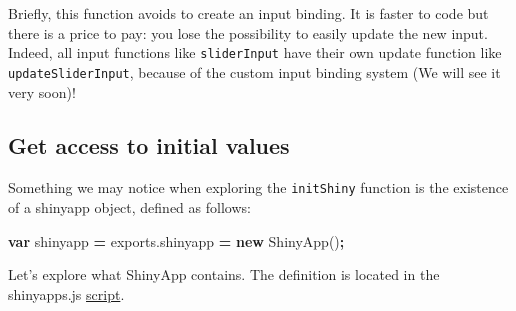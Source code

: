 \documentclass[]{book}
\newenvironment{Shaded}{\begin{snugshade}}{\end{snugshade}}
\newcommand{\AttributeTok}[1]{\textcolor[rgb]{0.77,0.63,0.00}{#1}}
\newcommand{\KeywordTok}[1]{\textcolor[rgb]{0.13,0.29,0.53}{\textbf{#1}}}
\newcommand{\NormalTok}[1]{#1}
\newcommand{\OperatorTok}[1]{\textcolor[rgb]{0.81,0.36,0.00}{\textbf{#1}}}
\newcommand{\VariableTok}[1]{\textcolor[rgb]{0.00,0.00,0.00}{#1}}
\begin{document}
Briefly, this function avoids to create an input binding. It is faster to code but there is a price to pay: you lose the possibility to easily update the new input. Indeed, all input functions like \texttt{sliderInput} have their own update function like \texttt{updateSliderInput}, because of the custom input binding system (We will see it very soon)!

\hypertarget{get-access-to-initial-values}{%
\subsection{Get access to initial values}\label{get-access-to-initial-values}}

Something we may notice when exploring the \texttt{initShiny} function is the existence of a shinyapp object, defined as follows:

\begin{Shaded}
\begin{Highlighting}[]
\KeywordTok{var}\NormalTok{ shinyapp }\OperatorTok{=} \VariableTok{exports}\NormalTok{.}\AttributeTok{shinyapp} \OperatorTok{=} \KeywordTok{new} \AttributeTok{ShinyApp}\NormalTok{()}\OperatorTok{;}
\end{Highlighting}
\end{Shaded}

Let's explore what ShinyApp contains. The definition is located in the shinyapps.js \href{https://github.com/rstudio/shiny/blob/master/srcjs/shinyapp.js}{script}.
\end{document}
